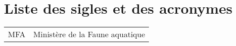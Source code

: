 
%
%


\chapter{Liste des sigles et des acronymes}


\begin{flushleft}
   \begin{tabular}{@{}ll}
		MFA			& Ministère de la Faune aquatique					\\
   \end{tabular}
\end{flushleft}

